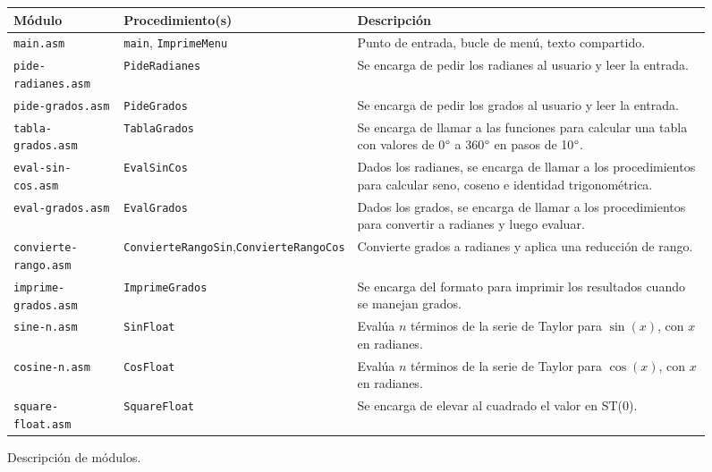 \documentclass[12pt]{article}
\begin{document}
\begin{figure}[H]
\centering
  \begin{tabularx}{\textwidth}{p{10em} p{10em} X}
    Módulo & Procedimiento(s) & Descripción \\
    \hline \hline
    \texttt{main.asm} & \texttt{main}, \texttt{ImprimeMenu} &
      Punto de entrada, bucle de menú, texto compartido. \\
    \hline
    \texttt{pide-radianes.asm} & \texttt{PideRadianes} &
      Se encarga de pedir los radianes al usuario y leer la entrada. \\
    \hline
    \texttt{pide-grados.asm} & \texttt{PideGrados} &
      Se encarga de pedir los grados al usuario y leer la entrada. \\
    \hline
    \texttt{tabla-grados.asm} & \texttt{TablaGrados} &
      Se encarga de llamar a las funciones para calcular una tabla con valores de 0$\degree$ a 360$\degree$ en pasos de 10$\degree$. \\
    \hline
    \texttt{eval-sin-cos.asm} & \texttt{EvalSinCos} &
      Dados los radianes, se encarga de llamar a los procedimientos para calcular seno, coseno e identidad trigonométrica. \\
    \hline
    \texttt{eval-grados.asm} & \texttt{EvalGrados} &
      Dados los grados, se encarga de llamar a los procedimientos para convertir a radianes y luego evaluar. \\
    \hline
    \texttt{convierte-rango.asm} & \texttt{ConvierteRangoSin},\newline\texttt{ConvierteRangoCos} &
      Convierte grados a radianes y aplica una reducción de rango. \\
    \hline
    \texttt{imprime-grados.asm} &  \texttt{ImprimeGrados} &
      Se encarga del formato para imprimir los resultados cuando se manejan grados. \\
    \hline
    \texttt{sine-n.asm} &  \texttt{SinFloat} &
      Evalúa $n$ términos de la serie de Taylor para $\sin(x)$, con $x$ en radianes. \\
    \hline
    \texttt{cosine-n.asm} &  \texttt{CosFloat} &
      Evalúa $n$ términos de la serie de Taylor para $\cos(x)$, con $x$ en radianes. \\
    \hline
    \texttt{square-float.asm} &  \texttt{SquareFloat} &
      Se encarga de elevar al cuadrado el valor en ST(0). \\
  \end{tabularx}
\caption{Descripción de módulos.}
\label{tabla-modulos}
\end{figure}
\end{document}
